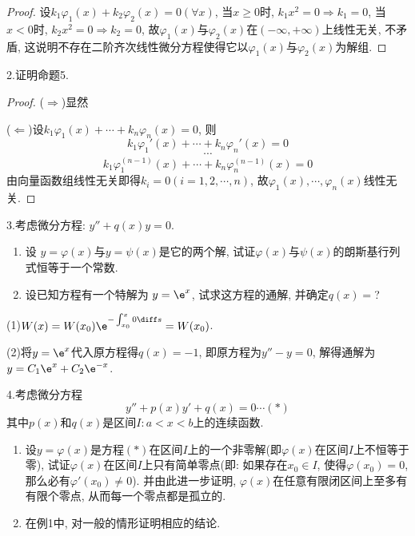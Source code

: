 \begin{proof} 
设$k_1\varphi_1(x)+k_2\varphi_2(x)=0(\forall x)$, 当$x\geq0$时, $k_1x^2=0\Rightarrow k_1=0$, 
当$x<0$时, $k_2x^2=0\Rightarrow k_2=0$, 故$\varphi_1(x)$与$\varphi_2(x)$在$(-\infty,+\infty)$上线性无关, 
不矛盾, 这说明不存在二阶齐次线性微分方程使得它以$\varphi_1(x)$与$\varphi_2(x)$为解组.
\end{proof}


2.证明命题5.

\begin{proof} 
($\Rightarrow$)显然

($\Leftarrow$)设$k_1\varphi_1(x)+\cdots+k_n\varphi_n(x)=0$, 则
\[k_1\varphi_1'(x)+\cdots+k_n\varphi_n'(x)=0\]
\[\cdots\]
\[k_1\varphi_1^{(n-1)}(x)+\cdots+k_n\varphi_n^{(n-1)}(x)=0\]
由向量函数组线性无关即得$k_i=0(i=1,2,\cdots,n)$, 故$\varphi_1(x),\cdots,\varphi_n(x)$线性无关.
\end{proof}


3.考虑微分方程: $y''+q(x)y=0$.
\begin{enumerate}[(1)]
\item 设 $y=\varphi(x)$与$y=\psi(x)$是它的两个解, 试证$\varphi(x)$与$\psi(x)$的朗斯基行列式恒等于一个常数.
\item 设已知方程有一个特解为 $y=\e^x$, 试求这方程的通解, 并确定$q(x)=$?
\end{enumerate}

\begin{solve}
(1)$W(x)=W(x_0)\e^{-\int_{x_0}^x0\diff s}=W(x_0)$.

(2)将$y=\e^x$代入原方程得$q(x)=-1$, 即原方程为$y''-y=0$, 解得通解为$y=C_1\e^x+C_2\e^{-x}$.
\end{solve}


4.考虑微分方程\[y''+p(x)y'+q(x)=0\cdots(*)\]
其中$p(x)$和$q(x)$是区间$I:a<x<b$上的连续函数.
\begin{enumerate}[(1)]
\item 设$y=\varphi(x)$是方程$(*)$在区间$I$上的一个非零解(即$\varphi(x)$在区间$I$上不恒等于零), 
试证$\varphi(x)$在区间$I$上只有简单零点(即: 如果存在$x_0\in I$, 使得$\varphi(x_0)=0$, 那么必有$\varphi'(x_0)\neq0$). 
并由此进一步证明, $\varphi(x)$在任意有限闭区间上至多有有限个零点, 从而每一个零点都是孤立的.
\item 在例1中, 对一般的情形证明相应的结论.
\end{enumerate}

